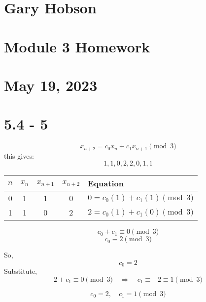\documentclass[12pt]{article}
\begin{document}
\section*{Gary Hobson}
\section*{Module 3 Homework} 
\section*{May 19, 2023}
\newpage

\section*{5.4 - 5   }
\[
x_{n+2} = c_0 x_n + c_1 x_{n+1} \pmod{3}
\]
this gives:
\[
1, 1, 0, 2, 2, 0, 1, 1
\]


\begin{center}
\begin{tabular}{|c|c|c|c|l|}
\hline
\( n \) & \( x_n \) & \( x_{n+1} \) & \( x_{n+2} \) & Equation \\
\hline
0 & 1 & 1 & 0 & \( 0 = c_0 (1) + c_1 (1) \pmod{3} \) \\
1 & 1 & 0 & 2 & \( 2 = c_0 (1) + c_1 (0) \pmod{3} \) \\
\hline
\end{tabular}
\end{center}

\[
c_0 + c_1 \equiv 0 \pmod{3}
\]
\[
c_0 \equiv 2 \pmod{3}
\]

So,
\[
c_0 = 2
\]
Substitute,
\[
2 + c_1 \equiv 0 \pmod{3} \quad \Rightarrow \quad c_1 \equiv -2 \equiv 1 \pmod{3}
\]

\[
c_0 = 2, \quad c_1 = 1 \pmod{3}
\]

\end{document}
